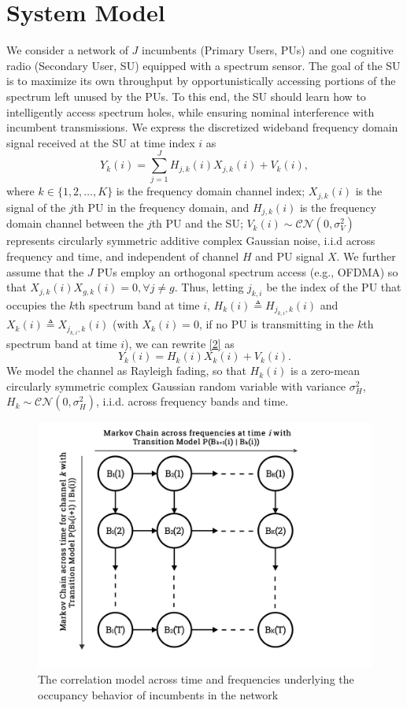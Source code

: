 \documentclass[10pt,twocolumn]{IEEEtran}
\begin{document}
\section{System Model}\label{II}
We consider a network of $J$ incumbents (Primary Users, PUs) and one cognitive radio (Secondary User, SU) equipped with a spectrum sensor. The goal of the SU is to maximize its own throughput by opportunistically accessing portions of the spectrum left unused by the PUs. To this end, the SU should learn how to intelligently access spectrum holes, while ensuring nominal interference with incumbent transmissions.
We express the discretized wideband frequency domain signal received at the SU
at time index $i$ as
\begin{equation}\label{2}
    Y_k(i) = \sum_{j=1}^{J} H_{j,k}(i)X_{j,k}(i) + V_k(i),
\end{equation}
where  $k {\in} \{1,2,\dots,K\}$
is the frequency domain channel index; $X_{j,k}(i)$ is the signal of the $j$th PU in the frequency domain, and $H_{j,k}(i)$ is the frequency domain channel between the $j$th PU and the SU; $V_k(i) {\sim} \mathcal{CN}(0,\sigma_V^2)$ represents circularly symmetric additive complex Gaussian noise, i.i.d across frequency and time, and independent of channel $H$ and PU signal $X$. We further assume that the $J$ PUs employ an orthogonal spectrum access (e.g., OFDMA) so that $X_{j,k}(i)X_{g,k}(i){=}0, \forall j{\neq}g$. Thus, letting $j_{k,i}$ be the index of the PU that occupies the $k$th spectrum band at time $i$, $H_{k}(i){\triangleq}H_{j_{k,i},k}(i)$ and $X_{k}(i){\triangleq}X_{j_{k,i},k}(i)$ (with $X_{k}(i){=}0$, if no PU is transmitting in the $k$th spectrum band at time $i$), we can rewrite \eqref{2} as 
\begin{equation}\label{3}
    Y_k(i) = H_{k}(i)X_{k}(i) + V_k(i).
\end{equation}
We model the channel as Rayleigh fading, so that $H_{k}(i)$ is a zero-mean circularly symmetric complex Gaussian random variable with variance $\sigma_H^2$, $H_k {\sim} \mathcal{CN}(0,\sigma_H^2)$, i.i.d. across frequency bands and time.
\begin{figure}
    \centering
    \includegraphics[width=0.7\linewidth]{MarkovChainsVisualization}
    \vspace{-5mm}
    \caption{The correlation model across time and frequencies underlying the occupancy behavior of incumbents in the network}
    \vspace{-5mm}
    \label{fig:1}
\end{figure}
\end{document}
